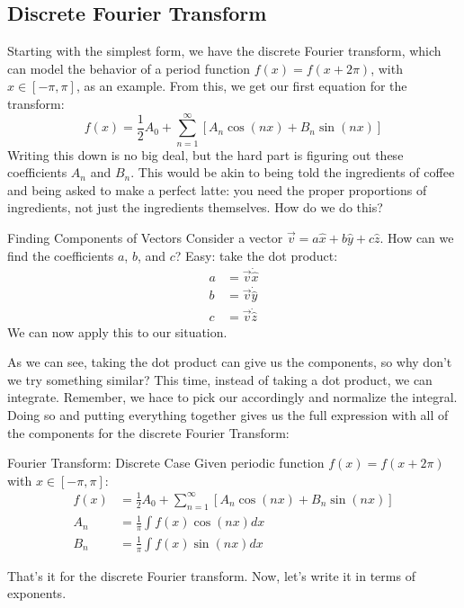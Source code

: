       \subsection{Discrete Fourier Transform}
        Starting with the simplest form, we have the discrete Fourier transform, which can model the behavior of a period function $f(x) = f(x+2\pi)$, with $x \in [-\pi,\pi]$, as an example. From this, we get our first equation for the transform:
        $$f(x) = \frac12 A_0 + \sum_{n=1}^{\infty}[A_n\cos(nx) + B_n\sin(nx)]$$
        Writing this down is no big deal, but the hard part is figuring out these coefficients $A_n$ and $B_n$. This would be akin to being told the ingredients of coffee and being asked to make a perfect latte: you need the proper proportions of ingredients, not just the ingredients themselves. How do we do this?
        \begin{example}{Finding Components of Vectors}{}
          Consider a vector $\vec{v} = a\hat{x} + b\hat{y} + c\hat{z}$. How can we find the coefficients $a$, $b$, and $c$? Easy: take the dot product:
          \begin{align*}
            a &= \vec{v}\dot\hat{x}\\
            b &= \vec{v}\dot\hat{y}\\
            c &= \vec{v}\dot\hat{z}
          \end{align*}
          We can now apply this to our situation.
        \end{example}
        As we can see, taking the dot product can give us the components, so why don't we try something similar? This time, instead of taking a dot product, we can integrate. Remember, we hace to pick our  accordingly and normalize the integral. Doing so and putting everything together gives us the full expression with all of the components for the discrete Fourier Transform:
        \newpage
        \begin{definition}{Fourier Transform: Discrete Case}{}
            Given periodic function $f(x) = f(x+2\pi)$ with $x \in [-\pi,\pi]$:
              \begin{align*}
                f(x) &= \frac12A_0 + \sum_{n=1}^{\infty}[A_n\cos(nx) + B_n\sin(nx)]\\
                A_n &= \frac{1}{\pi}\int f(x)\cos(nx)dx\\
                B_n &= \frac{1}{\pi}\int f(x)\sin(nx)dx
            \end{align*}
        \end{definition}
        That's it for the discrete Fourier transform. Now, let's write it in terms of exponents.

